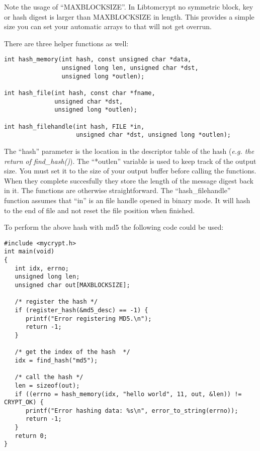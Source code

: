 \documentclass[b5paper]{book}
\begin{document}
Note the usage of ``MAXBLOCKSIZE''.  In Libtomcrypt no symmetric block, key or hash digest is larger than MAXBLOCKSIZE in
length.  This provides a simple size you can set your automatic arrays to that will not get overrun.

There are three helper functions as well:
 
\begin{verbatim}
int hash_memory(int hash, const unsigned char *data, 
                unsigned long len, unsigned char *dst,
                unsigned long *outlen);

int hash_file(int hash, const char *fname, 
              unsigned char *dst,
              unsigned long *outlen);

int hash_filehandle(int hash, FILE *in, 
                    unsigned char *dst, unsigned long *outlen);
\end{verbatim}

The ``hash'' parameter is the location in the descriptor table of the hash (\textit{e.g. the return of find\_hash()}).  
The ``*outlen'' variable is used to keep track of the output size.  You
must set it to the size of your output buffer before calling the functions.  When they complete succesfully they store
the length of the message digest back in it.  The functions are otherwise straightforward.  The ``hash\_filehandle'' 
function assumes that ``in'' is an file handle opened in binary mode.  It will hash to the end of file and not reset
the file position when finished.

To perform the above hash with md5 the following code could be used:
\begin{small}
\begin{verbatim}
#include <mycrypt.h>
int main(void)
{
   int idx, errno;
   unsigned long len;
   unsigned char out[MAXBLOCKSIZE];

   /* register the hash */
   if (register_hash(&md5_desc) == -1) {
      printf("Error registering MD5.\n");
      return -1;
   }

   /* get the index of the hash  */
   idx = find_hash("md5");

   /* call the hash */
   len = sizeof(out);
   if ((errno = hash_memory(idx, "hello world", 11, out, &len)) != CRYPT_OK) {
      printf("Error hashing data: %s\n", error_to_string(errno));
      return -1;
   }
   return 0;
}
\end{verbatim}
\end{small}
\end{document}
